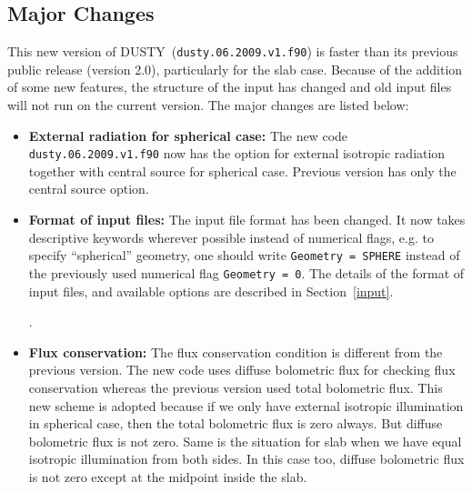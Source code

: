 \documentclass[11pt]{article}
\def\D  {{\sf DUSTY}}
\begin{document}
\subsection{Major Changes}
\label{major_changes}

This new version of \D\ ({\tt dusty.06.2009.v1.f90}) is faster than its previous public 
release (version 2.0), particularly for the slab case. Because of the addition of 
some new features, the structure of the input has changed and old input files will 
not run on the current version. The major changes are listed below:
%
\begin{itemize}
\item
{\bf External radiation for spherical case:} The new code {\tt dusty.06.2009.v1.f90} now has 
the option for external isotropic radiation together with central source for spherical 
case. Previous version has only the central source option.
%
\item
{\bf Format of input files:} The input file format has been changed. It now takes 
descriptive keywords wherever possible instead of numerical flags, e.g. to specify 
``spherical'' geometry, one should write {\tt  Geometry = SPHERE} instead of the 
previously used numerical flag {\tt  Geometry = 0}. The details of the format of 
input files, and available options are described in Section~\ref{input}. 

.
%
\item
{\bf Flux conservation:} The flux conservation condition is different from the previous 
version. The new code uses diffuse bolometric flux for checking flux conservation whereas 
the previous version used total bolometric flux. This new scheme is adopted because if we 
only have external isotropic illumination in spherical case, then the total bolometric flux 
is zero always. But diffuse bolometric flux is not zero. Same is the situation for slab when
we have equal isotropic illumination from both sides. In this case too, diffuse bolometric flux 
is not zero except at the midpoint inside the slab.  


\end{itemize}
\end{document}
